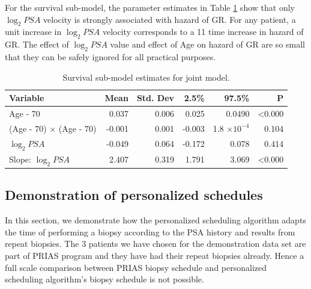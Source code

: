 For the survival sub-model, the parameter estimates in Table \ref{tab : PSA_survival} show that only $\log_2 PSA$ velocity is strongly associated with hazard of GR. For any patient, a unit increase in $\log_2 PSA$ velocity corresponds to a 11 time increase in hazard of GR. The effect of $\log_2 PSA$ value and effect of Age on hazard of GR are so small that they can be safely ignored for all practical purposes.

\begin{table}[!htb]
\centering
\caption{Survival sub-model estimates for joint model.}
\captionsetup{justification=centering}
\label{tab : PSA_survival}
\begin{tabular}{@{}lrrrrr@{}}
\toprule
Variable                      & Mean   & Std. Dev & 2.5\%  & 97.5\%                 & P              \\ \midrule
Age - 70                      & 0.037 & 0.006 & 0.025 & 0.0490                  & \textless0.000 \\
(Age - 70) $\times$ (Age - 70) & -0.001 & 0.001 & -0.003 & 1.8 $\times 10^{-4}$ & 0.104          \\
$\log_2 PSA$                  & -0.049 & 0.064 & -0.172 & 0.078 & 0.414         \\
Slope: $\log_2 PSA$           & 2.407 & 0.319 & 1.791 & 3.069 & \textless0.000 \\ \bottomrule
\end{tabular}
\end{table}

\subsection{Demonstration of personalized schedules}
\label{subsec : demo_prias_pers_sc}
In this section, we demonstrate how the personalized scheduling algorithm adapts the time of performing a biopsy according to the PSA history and results from repeat biopsies. The 3 patients we have chosen for the demonstration data set are part of PRIAS program and they have had their repeat biopsies already. Hence a full scale comparison between PRIAS biopsy schedule and personalized scheduling algorithm's biopsy schedule is not possible.\\

